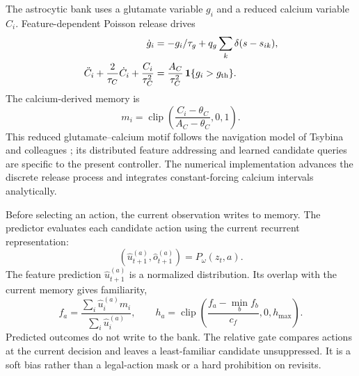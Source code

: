 The astrocytic bank uses a glutamate variable $g_i$ and a reduced calcium variable $C_i$. Feature-dependent Poisson release drives
\begin{align}
 \dot g_i&=-g_i/\tau_g+q_g\sum_k\delta(s-s_{ik}),\\
 \ddot C_i+\frac{2}{\tau_C}\dot C_i+\frac{C_i}{\tau_C^2}
 &=\frac{A_C}{\tau_C^2}\,\mathbf1\{g_i>g_{\rm th}\}.
\end{align}
The calcium-derived memory is
\begin{equation}
 m_i=\operatorname{clip}\!\left(\frac{C_i-\theta_C}{A_C-\theta_C},0,1\right).
\end{equation}
This reduced glutamate--calcium motif follows the navigation model of Tsybina and colleagues \cite{tsybina2026}; its distributed feature addressing and learned candidate queries are specific to the present controller. The numerical implementation advances the discrete release process and integrates constant-forcing calcium intervals analytically.

Before selecting an action, the current observation writes to memory. The predictor evaluates each candidate action using the current recurrent representation:
\begin{equation}
 (\widehat u^{(a)}_{t+1},\widehat o^{(a)}_{t+1})=P_\omega(z_t,a).
\end{equation}
The feature prediction $\widehat u^{(a)}_{t+1}$ is a normalized distribution. Its overlap with the current memory gives familiarity,
\begin{equation}
 f_a=\frac{\sum_i\widehat u_i^{(a)}m_i}{\sum_i\widehat u_i^{(a)}},\qquad
 h_a=\operatorname{clip}\!\left(\frac{f_a-\min_b f_b}{c_f},0,h_{\max}\right).
 \label{eq:familiarity}
\end{equation}
Predicted outcomes do not write to the bank. The relative gate compares actions at the current decision and leaves a least-familiar candidate unsuppressed. It is a soft bias rather than a legal-action mask or a hard prohibition on revisits.

